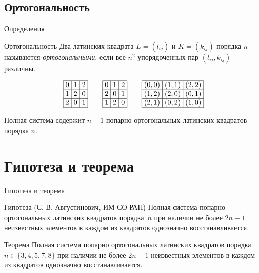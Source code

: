 \documentclass[8pt, hyperref={pdftex,unicode}, green]{beamer}
\newcommand{\LSfive}[1]{
    \begin{array}{|>{\hspace{-2pt}}c<{\hspace{-2pt}}|>{\hspace{-2pt}}c<{\hspace{-2pt}}|>{\hspace{-2pt}}c<{\hspace{-2pt}}|>{\hspace{-2pt}}c<{\hspace{-2pt}}|>{\hspace{-2pt}}c<{\hspace{-2pt}}|}\hline
        #1
    \end{array}
}
\begin{document}
\subsection{Ортогональность}
\begin{frame}{Определения}

    \begin{block}{Ортогональность}
        Два латинских квадрата $L = (l_{ij})$ и $K = (k_{ij})$ порядка $n$ называются {\it ортогональными}, если все $n^2$ упорядоченных пар $(l_{ij}, k_{ij})$ различны.
    \end{block}
    
    $$
    \LSfive{
        0 & 1 & 2 \\ \hline
        1 & 2 & 0 \\ \hline
        2 & 0 & 1 \\ \hline
    }
    \hspace{2em}
    \LSfive{
        0 & 1 & 2 \\ \hline
        2 & 0 & 1 \\ \hline
        1 & 2 & 0 \\ \hline
    }
    \hspace{2em}
    \LSfive{
        (0, 0) & (1, 1) & (2, 2) \\ \hline
        (1, 2) & (2, 0) & (0, 1) \\ \hline
        (2, 1) & (0, 2) & (1, 0) \\ \hline
    }
    $$
    
    \begin{block}{}
        Полная система содержит $n-1$ попарно ортогональных латинских квадратов порядка $n$.
    \end{block}
    

\end{frame}


\section{Гипотеза и теорема}
\begin{frame}{Гипотеза и теорема}

    \begin{block}{Гипотеза (С. В. Августинович, ИМ СО РАН)}
        Полная система попарно ортогональных латинских квадратов порядка~$n$ при наличии не более $2n-1$ неизвестных элементов в каждом из квадратов однозначно восстанавливается.
    \end{block}
    
    \begin{block}{Теорема}
        Полная система попарно ортогональных латинских квадратов порядка $n \in \{3,4,5,7,8\}$ при наличии не более $2n-1$ неизвестных элементов в каждом из квадратов однозначно восстанавливается. 
    \end{block}
  
\end{frame} 
\end{document}
